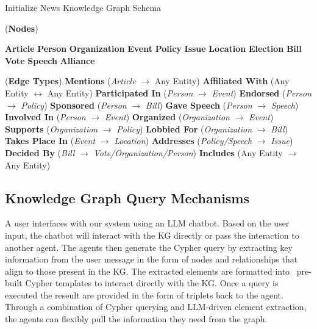 \documentclass[11pt]{article}
\begin{document}
\renewcommand{\thealgocf}{3}
\begin{algorithm}[h!]
\caption{Initialize News Knowledge Graph Schema}


\Define (\textbf{Nodes})
{

    {\textbf{Article}\;
    \textbf{Person}\;
    \textbf{Organization}\;
    \textbf{Event}\;
    \textbf{Policy}\;
    \textbf{Issue}\;
    \textbf{Location}\;
    \textbf{Election}\;
    \textbf{Bill}\;
    \textbf{Vote}\;
    \textbf{Speech}\;
    \textbf{Alliance}\;}
}

\Define (\textbf{Edge Types})
{
    \textbf{Mentions} (\textit{Article} $\rightarrow$ Any Entity)\;
    \textbf{Affiliated With} (Any Entity $\leftrightarrow$ Any Entity)\;
    \textbf{Participated In} (\textit{Person} $\rightarrow$ \textit{Event})\;
    \textbf{Endorsed} (\textit{Person} $\rightarrow$ \textit{Policy})\;
    \textbf{Sponsored} (\textit{Person} $\rightarrow$ \textit{Bill})\;
    \textbf{Gave Speech} (\textit{Person} $\rightarrow$ \textit{Speech})\;
    \textbf{Involved In} (\textit{Person} $\rightarrow$ \textit{Event})\;
    \textbf{Organized} (\textit{Organization} $\rightarrow$ \textit{Event})\;
    \textbf{Supports} (\textit{Organization} $\rightarrow$ \textit{Policy})\;
    \textbf{Lobbied For} (\textit{Organization} $\rightarrow$ \textit{Bill})\;
    \textbf{Takes Place In} (\textit{Event} $\rightarrow$ \textit{Location})\;
    \textbf{Addresses} (\textit{Policy/Speech} $\rightarrow$ \textit{Issue})\;
    \textbf{Decided By} (\textit{Bill} $\rightarrow$ \textit{Vote/Organization/Person})\;
    \textbf{Includes} (Any Entity $\rightarrow$ Any Entity)\;
}


\end{algorithm}


\subsection{ Knowledge Graph Query Mechanisms}
A user interfaces with our system using an LLM chatbot. Based on the user input, the chatbot will interact with the KG directly or pass the interaction to another agent. The agents then generate the Cypher query by extracting key information from the user message in the form of nodes and relationships that align to those present in the KG. The extracted elements are formatted into  pre-built Cypher templates to interact directly with the KG. Once a query is executed the reseult are provided in the form of triplets back to the agent. Through a combination of Cypher querying and LLM-driven element extraction, the agents can flexibly pull the information they need from the graph.
 
\end{document}
